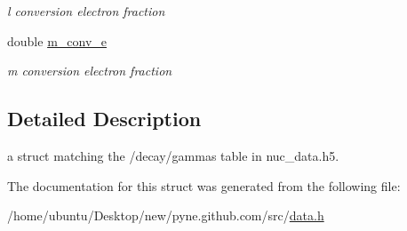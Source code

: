 \begin{DoxyCompactItemize}
\begin{DoxyCompactList}\small\item\em l conversion electron fraction \end{DoxyCompactList}\item 
double \hyperlink{structpyne_1_1gamma_a6c664717050818947e2e79d75e914c41}{m\+\_\+conv\+\_\+e}\hypertarget{structpyne_1_1gamma_a6c664717050818947e2e79d75e914c41}{}\label{structpyne_1_1gamma_a6c664717050818947e2e79d75e914c41}

\begin{DoxyCompactList}\small\item\em m conversion electron fraction \end{DoxyCompactList}\end{DoxyCompactItemize}


\subsection{Detailed Description}
a struct matching the \textquotesingle{}/decay/gammas\textquotesingle{} table in nuc\+\_\+data.\+h5. 

The documentation for this struct was generated from the following file\+:\begin{DoxyCompactItemize}
\item 
/home/ubuntu/\+Desktop/new/pyne.\+github.\+com/src/\hyperlink{data_8h}{data.\+h}\end{DoxyCompactItemize}
